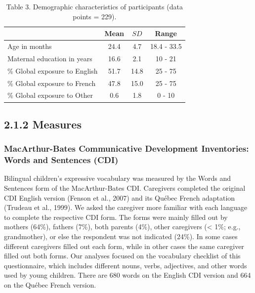 \documentclass[
  english,
  ,man,floatsintext]{apa6}
\begin{document}
\begin{table}[h]

\begin{center}
\begin{threeparttable}

\caption{\label{tab:table3}Table 3. Demographic characteristics of participants (data points = 229).}

\begin{tabular}{lccc}
\toprule
 & Mean & $SD$ & Range\\
\midrule
Age in months & 24.4 & 4.7 & 18.4 - 33.5\\
Maternal education in years & 16.6 & 2.1 & 10 - 21\\
\% Global exposure to English & 51.7 & 14.8 & 25 - 75\\
\% Global exposure to French & 47.8 & 15.0 & 25 - 75\\
\% Global exposure to Other & 0.6 & 1.8 & 0 - 10\\
\bottomrule
\end{tabular}

\end{threeparttable}
\end{center}

\end{table}

\hypertarget{measures}{%
\subsection{2.1.2 Measures}\label{measures}}

\hypertarget{macarthur-bates-communicative-development-inventories-words-and-sentences-cdi}{%
\subsubsection{MacArthur-Bates Communicative Development Inventories: Words and Sentences (CDI)}\label{macarthur-bates-communicative-development-inventories-words-and-sentences-cdi}}

Bilingual children's expressive vocabulary was measured by the Words and Sentences form of the MacArthur-Bates CDI. Caregivers completed the original CDI English version (Fenson et al., 2007) and its Québec French adaptation (Trudeau et al., 1999). We asked the caregiver more familiar with each language to complete the respective CDI form. The forms were mainly filled out by mothers (64\%), fathers (7\%), both parents (4\%), other caregivers (\textless{} 1\%; e.g., grandmother), or else the respondent was not indicated (24\%). In some cases different caregivers filled out each form, while in other cases the same caregiver filled out both forms. Our analyses focused on the vocabulary checklist of this questionnaire, which includes different nouns, verbs, adjectives, and other words used by young children. There are 680 words on the English CDI version and 664 on the Québec French version.
\end{document}
